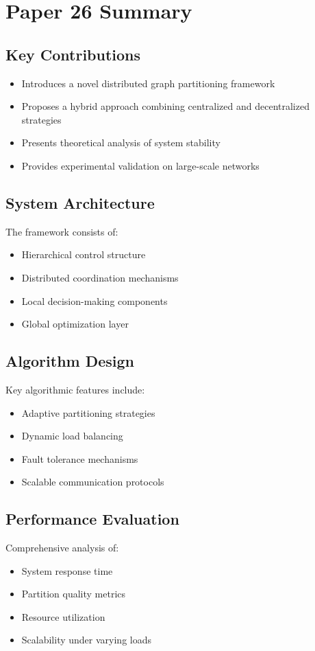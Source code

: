 \section{Paper 26 Summary}

\subsection{Key Contributions}
\begin{itemize}
    \item Introduces a novel distributed graph partitioning framework
    \item Proposes a hybrid approach combining centralized and decentralized strategies
    \item Presents theoretical analysis of system stability
    \item Provides experimental validation on large-scale networks
\end{itemize}

\subsection{System Architecture}
The framework consists of:
\begin{itemize}
    \item Hierarchical control structure
    \item Distributed coordination mechanisms
    \item Local decision-making components
    \item Global optimization layer
\end{itemize}

\subsection{Algorithm Design}
Key algorithmic features include:
\begin{itemize}
    \item Adaptive partitioning strategies
    \item Dynamic load balancing
    \item Fault tolerance mechanisms
    \item Scalable communication protocols
\end{itemize}

\subsection{Performance Evaluation}
Comprehensive analysis of:
\begin{itemize}
    \item System response time
    \item Partition quality metrics
    \item Resource utilization
    \item Scalability under varying loads
\end{itemize}

